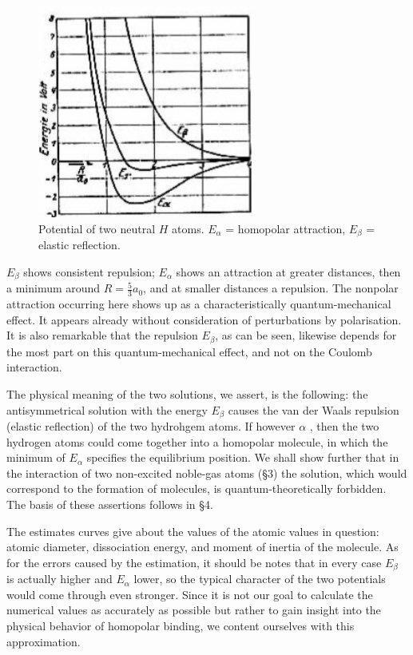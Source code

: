 \documentclass{article}
\begin{document}
\begin{figure}[h!]
\centering
\includegraphics[width=200pt]{images/figure1}
{\caption{Potential of two neutral $H$ atoms. $E_\alpha$ = homopolar attraction, $E_\beta$ = elastic reflection.}}
\end{figure}

$E_\beta$ shows consistent repulsion; $E_\alpha$ shows an attraction at greater distances, then a minimum around $R=\frac{5}{3}a_0$, and at smaller distances a repulsion. The nonpolar attraction occurring here shows up as a characteristically quantum-mechanical effect. It appears already without consideration of perturbations by polarisation. It is also remarkable that the repulsion $E_\beta$, as can be seen, likewise depends for the most part on this quantum-mechanical effect, and not on the Coulomb interaction.

The physical meaning of the two solutions, we assert, is the following: the antisymmetrical solution with the energy $E_\beta$ causes the van der Waals repulsion (elastic reflection) of the two hydrohgem atoms. If however $\alpha$ , then the two hydrogen atoms could come together into a homopolar molecule, in which the minimum of $E_\alpha$ specifies the equilibrium position. We shall show further that in the interaction of two non-excited noble-gas atoms (§3) the solution, which would correspond to the formation of molecules, is quantum-theoretically forbidden. The basis of these assertions follows in §4.

The estimates curves give about the values of the atomic values in question: atomic diameter, dissociation energy, and moment of inertia of the molecule. As for the errors caused by the estimation, it should be notes that in every case $E_\beta$ is actually higher and $E_\alpha$ lower, so the typical character of the two potentials would come through even stronger. Since it is not our goal to calculate the numerical values as accurately as possible but rather to gain insight into the physical behavior of homopolar binding, we content ourselves with this approximation.
\end{document}
